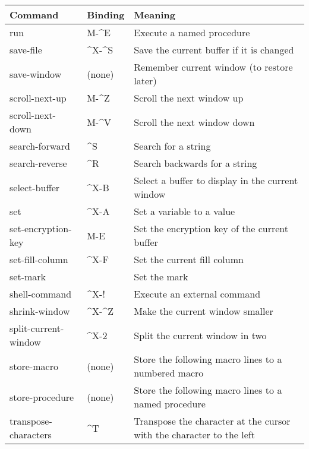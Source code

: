 \begin{tabular}{llp{300pt}}
Command & Binding & Meaning\\ \hline
run &  M-\^{}E & Execute a named procedure\\

save-file &  \^{}X-\^{}S & Save the current buffer if it is changed\\

save-window & (none) & Remember current window (to restore later)\\

scroll-next-up &  M-\^{}Z & Scroll the next window up\\

scroll-next-down &  M-\^{}V & Scroll the next window down\\

search-forward &  \^{}S & Search for a string\\

search-reverse &  \^{}R & Search backwards for a string\\

select-buffer &  \^{}X-B & Select a buffer to display in the
current window\\

set &  \^{}X-A & Set a variable to a value\\

set-encryption-key &  M-E & Set the encryption key of the current buffer\\

set-fill-column  &  \^{}X-F & Set the current fill column\\

set-mark & & Set the mark\\

shell-command &  \^{}X-! & Execute an external command\\

shrink-window &  \^{}X-\^{}Z & Make the current window smaller\\

split-current-window &  \^{}X-2 & Split the current window in two\\

store-macro & (none) & Store the following macro lines to a
numbered macro\\

store-procedure & (none) & Store the following macro lines to a
named procedure\\

transpose-characters &  \^{}T & Transpose the character at the cursor
with the character to the left\\


\end{tabular}
